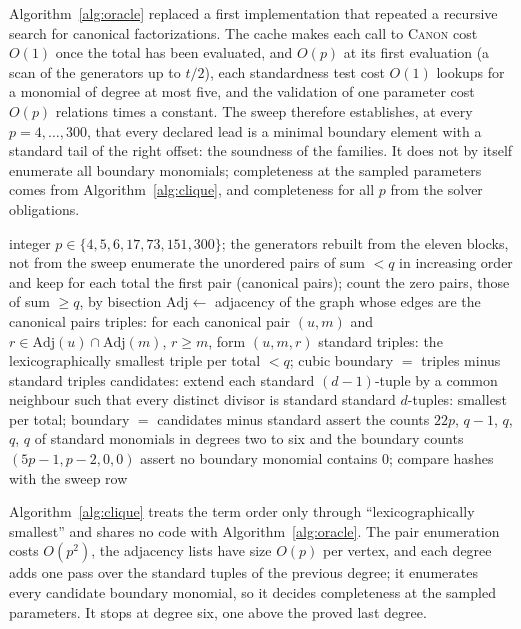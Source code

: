 \documentclass[11pt]{article}
\theoremstyle{definition}
\theoremstyle{remark}
\begin{document}
Algorithm~\ref{alg:oracle} replaced a first implementation that repeated a recursive search for
canonical factorizations. The cache makes each call to \textsc{Canon} cost $O(1)$ once the total
has been evaluated, and $O(p)$ at its first evaluation (a scan of the generators up to $t/2$), each standardness test cost $O(1)$ lookups for a monomial of degree at most five,
and the validation of one parameter cost $O(p)$ relations times a constant. The sweep therefore
establishes, at every $p=4,\ldots,300$, that every declared lead is a minimal boundary element
with a standard tail of the right offset: the soundness of the families. It does not by itself
enumerate all boundary monomials; completeness at the sampled parameters comes from
Algorithm~\ref{alg:clique}, and completeness for all $p$ from the solver obligations.

\begin{algorithm}[ht]
\caption{Clique reconstruction of the staircase (computation EXP-026, independent recomputation).}
\label{alg:clique}
\begin{algorithmic}[1]
\Require integer $p\in\{4,5,6,17,73,151,300\}$; the generators rebuilt from the eleven blocks, not from the sweep
\State enumerate the unordered pairs of sum $<q$ in increasing order and keep for each total the first pair (canonical pairs); count the zero pairs, those of sum $\geq q$, by bisection
\State $\mathrm{Adj}\gets$ adjacency of the graph whose edges are the canonical pairs
\State triples: for each canonical pair $(u,m)$ and $r\in\mathrm{Adj}(u)\cap\mathrm{Adj}(m)$, $r\geq m$, form $(u,m,r)$
\State standard triples: the lexicographically smallest triple per total $<q$; cubic boundary $=$ triples minus standard triples
  \State candidates: extend each standard $(d-1)$-tuple by a common neighbour such that every distinct divisor is standard
  \State standard $d$-tuples: smallest per total; boundary $=$ candidates minus standard
\EndFor
\State assert the counts $22p$, $q-1$, $q$, $q$, $q$ of standard monomials in degrees two to six and the boundary counts $(5p-1,p-2,0,0)$
\State assert no boundary monomial contains $0$; compare hashes with the sweep row
\end{algorithmic}
\end{algorithm}

Algorithm~\ref{alg:clique} treats the term order only through ``lexicographically smallest'' and
shares no code with Algorithm~\ref{alg:oracle}. The pair enumeration costs $O(p^2)$, the
adjacency lists have size $O(p)$ per vertex, and each degree adds one pass over the standard
tuples of the previous degree; it enumerates every candidate boundary monomial, so it decides
completeness at the sampled parameters. It stops at degree six, one above the proved last degree.
\end{document}
